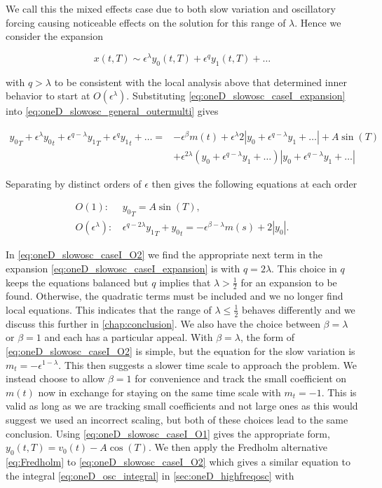 We call this the mixed effects case due to both slow variation and oscillatory forcing causing noticeable effects on the solution for this range of $\lambda$. Hence we consider the expansion

\begin{equation}\label{eq:oneD_slowosc_caseI_expansion}
x(t,T)\sim \epsilon^{\lambda} y_0(t,T)+\epsilon^q y_1(t,T)+\ldots
\end{equation}

with $q>\lambda$ to be consistent with the local analysis above that determined inner behavior to start at $O(\epsilon^\lambda)$. Substituting \eqref{eq:oneD_slowosc_caseI_expansion} into \eqref{eq:oneD_slowosc_general_outermulti} gives

\begin{equation*}
\begin{aligned}
{y_0}_T+\epsilon^{\lambda}{y_0}_t+\epsilon^{q-\lambda} {y_1}_T+\epsilon^{q} {y_1}_t+\ldots={} & -\epsilon^{\beta}m(t)+\epsilon^\lambda 2|y_0 +\epsilon^{q-\lambda} y_1+\ldots|+ A\sin(T) \\
& + \epsilon^{2\lambda}( y_0 +\epsilon^{q-\lambda} y_1+\ldots)|y_0 +\epsilon^{q-\lambda} y_1+\ldots |
\end{aligned}
\end{equation*}

Separating by distinct orders of $\epsilon$ then gives the following equations at each order

\begin{align} \label{eq:oneD_slowosc_caseI_O1}
O(1): & \,{y_0}_T = A\sin(T),\\ \label{eq:oneD_slowosc_caseI_O2}
O(\epsilon^\lambda):  &\, \epsilon^{q-2\lambda}{y_1}_T+{y_0}_t=-\epsilon^{\beta-\lambda}m(s)+2|y_0|.
\end{align}

In \eqref{eq:oneD_slowosc_caseI_O2} we find the appropriate next term in the expansion \eqref{eq:oneD_slowosc_caseI_expansion} is with $q=2\lambda$. This choice in $q$ keeps the equations balanced but $q$ implies that $\lambda> \frac{1}{2}$ for an expansion to be found. Otherwise, the quadratic terms must be included and we no longer find local equations. This indicates that the range of $\lambda\le\frac{1}{2}$ behaves differently and we discuss this further in \autoref{chap:conclusion}. We also have the choice between $\beta=\lambda$ or $\beta=1$ and each has a particular appeal. With $\beta=\lambda$, the form of \eqref{eq:oneD_slowosc_caseI_O2} is simple, but the equation for the slow variation is $m_t=-\epsilon^{1-\lambda}$. This then suggests a slower time scale to approach the problem. We instead choose to allow $\beta=1$ for convenience and track the small coefficient on $m(t)$ now in exchange for staying on the same time scale with $m_t=-1$. This is valid as long as we are tracking small coefficients and not large ones as this would suggest we used an incorrect scaling, but both of these choices lead to the same conclusion. Using \eqref{eq:oneD_slowosc_caseI_O1} gives the appropriate form, $y_0(t,T)=v_0(t)-A\cos(T)$. We then apply the Fredholm alternative \eqref{eq:Fredholm} to \eqref{eq:oneD_slowosc_caseI_O2} which gives a similar equation to the integral \eqref{eq:oneD_osc_integral} in \autoref{sec:oneD_highfreqosc} with

